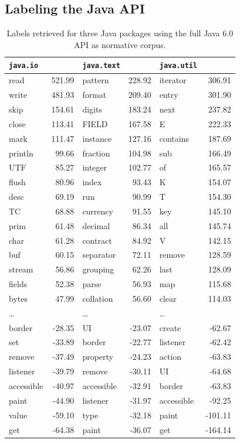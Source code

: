 \documentclass[10pt]{book}
\begin{document}
\subsection{Labeling the Java API}\label{example1}

\begin{table}
{\scriptsize \begin{center}
\begin{tabular}{lr | lr | lr}
\verb$java.io$ & ~ & \verb$java.text$ & ~ &  \verb$java.util$ & ~ \\
\hline
read & 521.99 & pattern & 228.92 & iterator & 306.91\\
write & 481.93 & format & 209.40 & entry & 301.90\\
skip & 154.61 & digits & 183.24 & next & 237.82\\
close & 113.41 & FIELD & 167.58 & E & 222.33\\
mark & 111.47 & instance & 127.16 & contains & 187.69\\
println & 99.66 & fraction & 104.98 & sub & 166.49\\
UTF & 85.27 & integer & 102.77 & of & 165.57\\
flush & 80.96 & index & 93.43 & K & 154.07\\
desc & 69.19 & run & 90.99 & T & 154.30\\
TC & 68.88 & currency & 91.55 & key & 145.10\\
prim & 61.48 & decimal & 86.34 & all & 145.74\\
char & 61.28 & contract & 84.92 & V & 142.15\\
buf & 60.15 & separator & 72.11 & remove & 128.59\\
stream & 56.86 & grouping & 62.26 & last & 128.09\\
fields & 52.38 & parse & 56.93 & map & 115.68\\
bytes & 47.99 & collation & 56.60 & clear & 114.03\\
\dots & ~ & \dots & ~ & \dots & ~ \\
border & -28.35 & UI & -23.07 & create & -62.67\\
set & -33.89 & border & -22.77 & listener & -62.42\\
remove & -37.49 & property & -24.23 & action & -63.83\\
listener & -39.79 & remove & -30.11 & UI & -64.68\\
accessible & -40.97 & accessible & -32.91 & border & -63.83\\
paint & -44.90 & listener & -31.97 & accessible & -92.25\\
value & -59.10 & type & -32.18 & paint & -101.11\\
get & -64.38 & paint & -36.07 & get & -164.14\\
\end{tabular}
\end{center}}
\caption{Labels retrieved for three Java packages using the full Java 6.0 API as normative corpus.}
\label{tab:one}
\end{table}%
\end{document}
